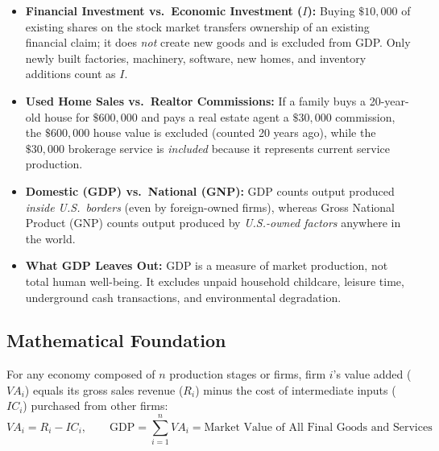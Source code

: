 \documentclass[11pt,letterpaper]{article}
\begin{document}
\begin{coreprinciple}
\begin{itemize}
    \item \textbf{Financial Investment vs.\ Economic Investment ($I$):} Buying $\$10{,}000$ of existing shares on the stock market transfers ownership of an existing financial claim; it does \emph{not} create new goods and is excluded from GDP. Only newly built factories, machinery, software, new homes, and inventory additions count as $I$.
    \item \textbf{Used Home Sales vs.\ Realtor Commissions:} If a family buys a 20-year-old house for $\$600{,}000$ and pays a real estate agent a $\$30{,}000$ commission, the $\$600{,}000$ house value is excluded (counted 20 years ago), while the $\$30{,}000$ brokerage service is \emph{included} because it represents current service production.
    \item \textbf{Domestic (GDP) vs.\ National (GNP):} GDP counts output produced \emph{inside U.S.\ borders} (even by foreign-owned firms), whereas Gross National Product (GNP) counts output produced by \emph{U.S.-owned factors} anywhere in the world.
    \item \textbf{What GDP Leaves Out:} GDP is a measure of market production, not total human well-being. It excludes unpaid household childcare, leisure time, underground cash transactions, and environmental degradation.
\end{itemize}
\end{coreprinciple}

\subsection*{Mathematical Foundation}
For any economy composed of $n$ production stages or firms, firm $i$'s value added ($VA_i$) equals its gross sales revenue ($R_i$) minus the cost of intermediate inputs ($IC_i$) purchased from other firms:
\begin{equation}
VA_i = R_i - IC_i, \qquad \text{GDP} = \sum_{i=1}^{n} VA_i = \text{Market Value of All Final Goods and Services}
\end{equation}
\end{document}
